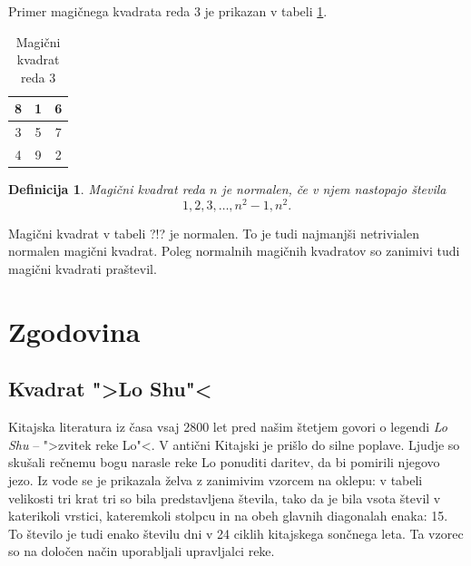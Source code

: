\documentclass[a4paper,12pt]{article}
\newtheorem{definicija}[izrek]{Definicija}
\newcommand{\pojem}[1]{\emph{#1}}
\newenvironment{magic}[3]{\begin{table}[!ht]
      \centering
      \caption{#1}
      \Large
      \label{#3}
      \begin{tabular}{|*{#2}{c|}}\hline}{\end{tabular}
   \end{table}}
\begin{document}
Primer magičnega kvadrata reda 3 je prikazan v tabeli \ref{table:mag3}.

   
   \begin{magic}{Magični kvadrat reda 3}{3}{magicni kvadrat reda 3}
      \label{table:mag3}
         8 & 1 & 6 \\\hline
         3 & 5 & 7 \\\hline
         4 & 9 & 2 \\\hline
   \end{magic}

\begin{definicija}
   \label{eq:numbers}
   Magični kvadrat reda $n$ je \pojem{normalen}, če v njem nastopajo števila
   \begin{equation}
      1, 2, 3, \ldots, n^2-1, n^2.
   \end{equation}
\end{definicija}

Magični kvadrat v tabeli ?!? je normalen.
To je tudi najmanjši netrivialen normalen magični kvadrat.
Poleg normalnih magičnih kvadratov so zanimivi tudi magični kvadrati praštevil.


\section{Zgodovina}

\subsection{Kvadrat ">Lo Shu"<}

Kitajska literatura iz časa vsaj 2800 let pred našim štetjem govori o legendi
\pojem{Lo Shu} -- ">zvitek reke Lo"<. V antični Kitajski je prišlo do
silne poplave. Ljudje so skušali rečnemu bogu narasle reke Lo ponuditi daritev,
da bi pomirili njegovo jezo. Iz vode se je prikazala želva z zanimivim vzorcem
na oklepu: v tabeli velikosti tri krat tri so bila predstavljena števila, tako
da je bila vsota števil v katerikoli vrstici, kateremkoli stolpcu in na obeh
glavnih diagonalah enaka: 15. To število je tudi enako številu dni v 24 ciklih
kitajskega sončnega leta. Ta vzorec so na določen način uporabljali upravljalci
reke.
\end{document}
